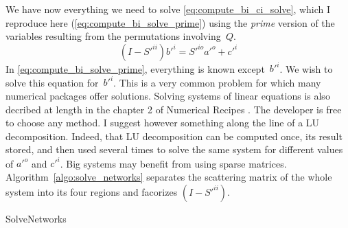 We have now everything we need to solve \cref{eq:compute_bi_ci_solve}, which I reproduce here (\cref{eq:compute_bi_solve_prime}) using the \textit{prime} version of the variables resulting from the permutations involving~$Q$.
\begin{equation}
    (I - S'^{ii})b'^i = S'^{io}a'^o + c'^i \label{eq:compute_bi_solve_prime}
\end{equation}
In \cref{eq:compute_bi_solve_prime}, everything is known except~$b'^i$.
We wish to solve this equation for~$b'^i$.
This is a very common problem for which many numerical packages offer solutions.
Solving systems of linear equations is also decribed at length in the chapter 2 of Numerical Recipes \cite{Press:2007:NRE:1403886}.
The developer is free to choose any method.
I suggest however something along the line of a LU decomposition.
Indeed, that LU decomposition can be computed once, its result stored, and then used several times to solve the same system for different values of $a'^o$ and $c'^i$.
Big systems may benefit from using sparse matrices.
Algorithm~\cref{algo:solve_networks} separates the scattering matrix of the whole system into its four regions and facorizes $(I - S'^{ii})$.
\begin{algorithm}
    \caption{SolveNetworks}
    \label{algo:solve_networks}
    \begin{algorithmic}
         
         
         
         
         
         
        \State{}
        \State{} 
        \\ 
        \EndFunction
    \end{algorithmic}
\end{algorithm}

